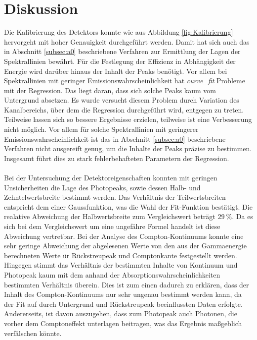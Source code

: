 \section{Diskussion}
\label{sec:Diskussion}
Die Kalibrierung des Detektors konnte wie aus Abbildung \ref{fig:Kalibrierung} hervorgeht mit hoher Genauigkeit durchgeführt werden.
Damit hat sich auch das in Abschnitt \ref{subsec:a0} beschriebene Verfahren zur Ermittlung der Lagen der Spektrallinien bewährt.
Für die Festlegung der Effizienz in Abhängigkeit der Energie wird darüber hinaus der Inhalt der Peaks benötigt.
Vor allem bei Spektrallinien mit geringer Emissionswahrscheinlichkeit hat \textit{curve\_fit} Probleme mit der Regression.
Das liegt daran, dass sich solche Peaks kaum vom Untergrund absetzen.
Es wurde versucht diesem Problem durch Variation des Kanalbereichs, über dem die Regression durchgeführt wird, entgegen zu treten.
Teilweise lassen sich so bessere Ergebnisse erzielen, teilweise ist eine Verbesserung nicht möglich.
Vor allem für solche Spektrallinien mit geringerer Emissionswahrscheinlichkeit ist das in Abschnitt \ref{subsec:a0} beschriebene Verfahren nicht ausgereift genug, um die Inhalte der Peaks präzise zu bestimmen.
Insgesamt führt dies zu stark fehlerbehafteten Parametern der Regression.\\ \\
Bei der Untersuchung der Detektoreigenschaften konnten mit geringen Unsicherheiten die Lage des Photopeaks,
sowie dessen Halb- und Zehntelwertsbreite bestimmt werden. Das Verhältnis der Teilwertsbreiten entspricht
dem einer Gaussfunktion, was die Wahl der Fit-Funktion bestätigt. Die realative Abweichung der Halbwertsbreite
zum Vergleichswert beträgt $\SI{29}{\percent}$. Da es sich bei dem Vergleichswert um eine ungefähre Formel
handelt ist diese Abweichung vertretbar. Bei der Analyse des Compton-Kontinuums konnte eine sehr
geringe Abweichung der abgelesenen Werte von den aus der Gammaenergie berechneten Werte
ür Rückstreupeak und Comptonkante festgestellt werden. Hingegen stimmt das Verhältnis der bestimmten Inhalte von
Kontinuum und Photopeak kaum mit dem anhand der Absorptionswahrscheinlichkeiten bestimmten Verhältnis überein.
Dies ist zum einen dadurch zu erklären, dass der Inhalt des Compton-Kontinuums nur sehr ungenau
bestimmt werden kann, da der Fit auf durch Untergrund und Rückstreupeak beeinflussten Daten erfolgte. Andererseits,
ist davon auszugehen, dass zum Photopeak auch Photonen, die vorher dem Comptoneffekt unterlagen beitragen, was das
Ergebnis maßgeblich verfälschen könnte.\\ \\
